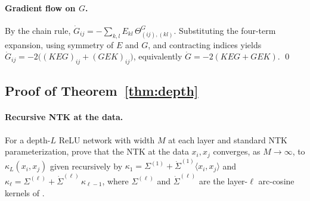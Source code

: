 \documentclass{article}
\newcommand{\E}{E}
\begin{document}
\paragraph{Gradient flow on $G$.}
By the chain rule,
$\dot G_{ij} = -\sum_{k,l}\E_{kl}\,\Theta^G_{(ij),(kl)}$. Substituting
the four-term expansion, using symmetry of $\E$ and $G$, and contracting
indices yields
$\dot G_{ij} = -2\bigl((K\E G)_{ij} + (G\E K)_{ij}\bigr)$, equivalently
$\dot G = -2(K\E G + G\E K)$. \qed

\subsection{Proof of Theorem~\ref{thm:depth}}

\paragraph{Recursive NTK at the data.}
For a depth-$L$ ReLU network with width $M$ at each layer and standard NTK
parameterization, \citet{jacot2018neural} prove that the NTK at the data
$x_i, x_j$ converges, as $M \to \infty$, to $\kappa_L(x_i, x_j)$ given
recursively by $\kappa_1 = \Sigma^{(1)} + \dot\Sigma^{(1)}\langle x_i, x_j\rangle$
and $\kappa_\ell = \Sigma^{(\ell)} + \dot\Sigma^{(\ell)}\,\kappa_{\ell-1}$,
where $\Sigma^{(\ell)}$ and $\dot\Sigma^{(\ell)}$ are the layer-$\ell$
arc-cosine kernels of \citet{cho2009kernel}.
\end{document}
